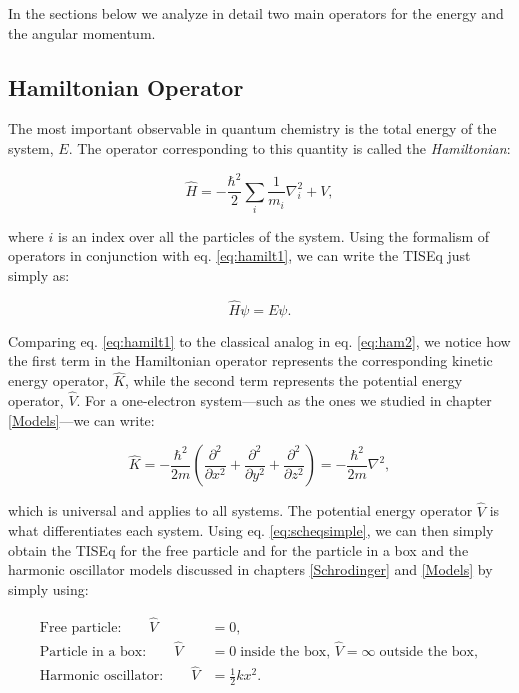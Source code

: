 \documentclass[
  english,
  9pt,
]{extbook}
\theoremstyle{definition}
\theoremstyle{definition}
\theoremstyle{definition}
\theoremstyle{definition}
\theoremstyle{remark}
\begin{document}
\normalsize

In the sections below we analyze in detail two main operators for the energy and the angular momentum.

\subsection{Hamiltonian Operator}\label{hamiltonian-operator}

The most important observable in quantum chemistry is the total energy of the system, \(E\). The operator corresponding to this quantity is called the \emph{Hamiltonian}:

\begin{equation}
\hat{H} = - \frac{\hbar^2}{2} \sum_i \frac{1}{m_i} \nabla_i^2 + V,
\label{eq:hamilt1}  
\end{equation}

where \(i\) is an index over all the particles of the system. Using the formalism of operators in conjunction with eq. \eqref{eq:hamilt1}, we can write the TISEq just simply as:

\begin{equation}
\hat{H} \psi = E\psi.
\label{eq:scheqsimple}  
\end{equation}

Comparing eq. \eqref{eq:hamilt1} to the classical analog in eq. \eqref{eq:ham2}, we notice how the first term in the Hamiltonian operator represents the corresponding kinetic energy operator, \(\hat{K}\), while the second term represents the potential energy operator, \(\hat{V}\). For a one-electron system---such as the ones we studied in chapter \ref{Models}---we can write:

\begin{equation}
\hat{K}=- \frac{\hbar^2}{2m} \left(\frac{\partial^2}{\partial x^2} + \frac{\partial^2}{\partial y^2} + \frac{\partial^2}{\partial z^2} \right) = -\frac{\hbar^2}{2m} \nabla^2,
\label{eq:hamilt2}  
\end{equation}

which is universal and applies to all systems. The potential energy operator \(\hat{V}\) is what differentiates each system. Using eq. \eqref{eq:scheqsimple}, we can then simply obtain the TISEq for the free particle and for the particle in a box and the harmonic oscillator models discussed in chapters \ref{Schrodinger} and \ref{Models} by simply using:

\begin{equation}
\begin{aligned}
\text{Free particle:}\qquad \hat{V} &= 0, \\
\text{Particle in a box:}\qquad \hat{V} &= 0 \; \text{inside the box, } \hat{V} = \infty \; \text{outside the box},\\
\text{Harmonic oscillator:}\qquad \hat{V} &= \frac{1}{2}kx^2. \\
\end{aligned}
\label{eq:hamilt3}  
\end{equation}
\end{document}
